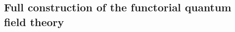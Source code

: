\documentclass[11pt]{report}
\newtheorem{prop}[theorem]{Proposition}
\theoremstyle{definition}
\theoremstyle{remark}
\theoremstyle{remark}
\newcommand{\Hom}{\operatorname{Hom}}
\newcommand{\C}{\mathbb{C}}
\begin{document}


\subsection{Full construction of the functorial quantum field theory}
\end{document}
